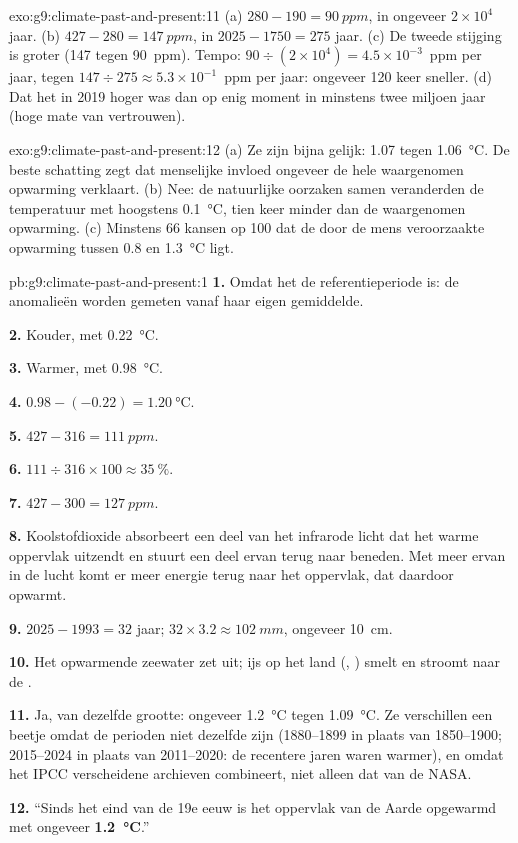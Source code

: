 \begin{solution}{exo:g9:climate-past-and-present:11}
(a) $280 - 190 = \qty{90}{ppm}$, in ongeveer $2 \times 10^4$ jaar. (b) $427
- 280 = \qty{147}{ppm}$, in $2025 - 1750 = 275$ jaar. (c) De tweede
stijging is groter (147 tegen 90~ppm). Tempo: $90 \div (2 \times 10^4) =
4.5 \times 10^{-3}$~ppm per jaar, tegen $147 \div 275 \approx 5.3 \times
10^{-1}$~ppm per jaar: ongeveer 120 keer sneller. (d) Dat het in 2019
hoger was dan op enig moment in minstens twee miljoen jaar (hoge mate van
vertrouwen).
\end{solution}

\begin{solution}{exo:g9:climate-past-and-present:12}
(a) Ze zijn bijna gelijk: 1.07 tegen \qty{1.06}{\degreeCelsius}. De beste
schatting zegt dat menselijke invloed ongeveer de hele waargenomen
opwarming verklaart. (b) Nee: de natuurlijke oorzaken samen veranderden de
temperatuur met hoogstens \qty{0.1}{\degreeCelsius}, tien keer minder dan
de waargenomen opwarming. (c) Minstens 66 kansen op 100 dat de door de mens
veroorzaakte opwarming tussen 0.8 en \qty{1.3}{\degreeCelsius} ligt.
\end{solution}

\begin{solution}{pb:g9:climate-past-and-present:1}
\textbf{1.} Omdat het de referentieperiode is: de anomalieën worden
gemeten vanaf haar eigen gemiddelde.

\textbf{2.} Kouder, met \qty{0.22}{\degreeCelsius}.

\textbf{3.} Warmer, met \qty{0.98}{\degreeCelsius}.

\textbf{4.} $0.98 - (-0.22) = \qty{1.20}{\degreeCelsius}$.

\textbf{5.} $427 - 316 = \qty{111}{ppm}$.

\textbf{6.} $111 \div 316 \times 100 \approx 35~\%$.

\textbf{7.} $427 - 300 = \qty{127}{ppm}$.

\textbf{8.} Koolstofdioxide absorbeert een deel van het infrarode licht dat
het warme oppervlak uitzendt en stuurt een deel ervan terug naar beneden.
Met meer ervan in de lucht komt er meer energie terug naar het oppervlak,
dat daardoor opwarmt.

\textbf{9.} $2025 - 1993 = 32$ jaar; $32 \times 3.2 \approx
\qty{102}{mm}$, ongeveer \qty{10}{cm}.

\textbf{10.} Het opwarmende zeewater zet uit; ijs op het land (,
) smelt en stroomt naar de .

\textbf{11.} Ja, van dezelfde grootte: ongeveer \qty{1.2}{\degreeCelsius}
tegen \qty{1.09}{\degreeCelsius}. Ze verschillen een beetje omdat de
perioden niet dezelfde zijn (1880--1899 in plaats van 1850--1900;
2015--2024 in plaats van 2011--2020: de recentere jaren waren warmer), en
omdat het IPCC verscheidene archieven combineert, niet alleen dat van de
NASA.

\textbf{12.} ``Sinds het eind van de 19e eeuw is het oppervlak van de
Aarde opgewarmd met ongeveer \textbf{\qty{1.2}{\degreeCelsius}}.''
\end{solution}
